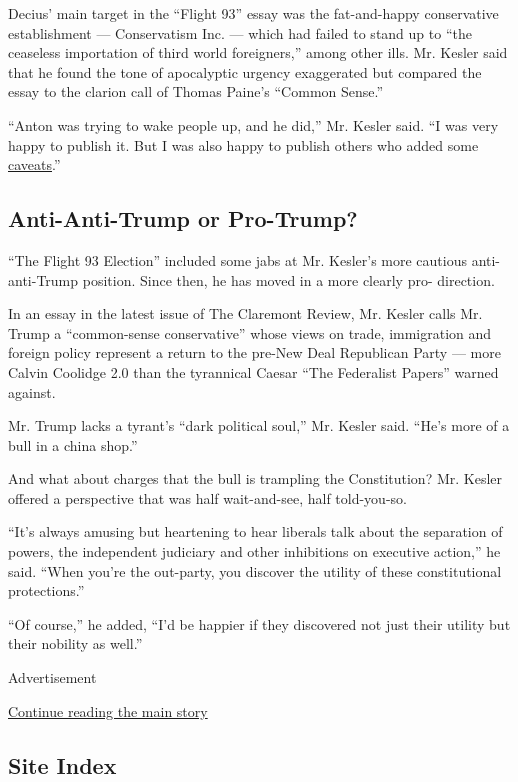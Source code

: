 Decius' main target in the ``Flight 93'' essay was the fat-and-happy
conservative establishment --- Conservatism Inc. --- which had failed to
stand up to ``the ceaseless importation of third world foreigners,''
among other ills. Mr. Kesler said that he found the tone of apocalyptic
urgency exaggerated but compared the essay to the clarion call of Thomas
Paine's ``Common Sense.''

``Anton was trying to wake people up, and he did,'' Mr. Kesler said. ``I
was very happy to publish it. But I was also happy to publish others who
added some
\href{http://www.claremont.org/crb/basicpage/trump-and-prudence-a-reply-to-decius/}{caveats}.''

\hypertarget{anti-anti-trump-or-pro-trump}{%
\subsection{Anti-Anti-Trump or
Pro-Trump?}\label{anti-anti-trump-or-pro-trump}}

``The Flight 93 Election'' included some jabs at Mr. Kesler's more
cautious anti-anti-Trump position. Since then, he has moved in a more
clearly pro- direction.

In an essay in the latest issue of The Claremont Review, Mr. Kesler
calls Mr. Trump a ``common-sense conservative'' whose views on trade,
immigration and foreign policy represent a return to the pre-New Deal
Republican Party --- more Calvin Coolidge 2.0 than the tyrannical Caesar
``The Federalist Papers'' warned against.

Mr. Trump lacks a tyrant's ``dark political soul,'' Mr. Kesler said.
``He's more of a bull in a china shop.''

And what about charges that the bull is trampling the Constitution? Mr.
Kesler offered a perspective that was half wait-and-see, half
told-you-so.

``It's always amusing but heartening to hear liberals talk about the
separation of powers, the independent judiciary and other inhibitions on
executive action,'' he said. ``When you're the out-party, you discover
the utility of these constitutional protections.''

``Of course,'' he added, ``I'd be happier if they discovered not just
their utility but their nobility as well.''

Advertisement

\protect\hyperlink{after-bottom}{Continue reading the main story}

\hypertarget{site-index}{%
\subsection{Site Index}\label{site-index}}

